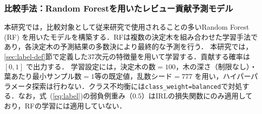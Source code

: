 \documentclass[submit]{ipsj}
\newcommand{\todo}[1]{\colorbox{yellow}{{\bf TODO}:}{\color{red} {\textbf{[#1]}}}}
\begin{document}



\subsubsection{比較手法：Random Forestを用いたレビュー貢献予測モデル}\label{sec:rf}
本研究では，比較対象として従来研究で使用されることの多いRandom Forest (RF) を用いたモデルを構築する．RFは複数の決定木を組み合わせた学習手法であり，各決定木の予測結果の多数決により最終的な予測を行う．
本研究では，\ref{sec:label-def}節で定義した37次元の特徴量を用いて学習する\cite{breiman_rf}．貢献する確率は $[0, 1]$ で出力する． 学習設定には，決定木の数$= 100$，木の深さ（制限なし）・葉あたり最小サンプル数$=1$等の既定値，乱数シード$=777$ を用い，ハイパーパラメータ探索は行わない．クラス不均衡には\texttt{class\_weight=balanced}で対処する．なお，式~(\ref{eq:label})の弱負例重み（$0.5$）はIRLの損失関数にのみ適用しており，RFの学習には適用していない．

\end{document}
